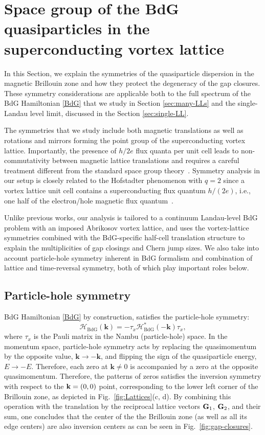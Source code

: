 \documentclass[10pt,prb,aps,superscriptaddress,amsmath,amssymb,twocolumn,floatfix,longbibliography]{revtex4-1}
\newcommand{\be}{\begin{equation} }
\newcommand{\ee}{\end{equation}}
\newcommand{\bk}{{\bf k}}
\newcommand{\bG}{{\bf G}}
\begin{document}
\section{Space group of the BdG quasiparticles in the superconducting vortex lattice}
\label{sec:symmetry}

In this Section, we explain the symmetries of the quasiparticle dispersion in the magnetic Brillouin zone and how they protect the degeneracy of the gap closures. These symmetry considerations are applicable both to the full spectrum of the BdG Hamiltonian \eqref{BdG} that we study in Section \ref{sec:many-LLs} and the single-Landau level limit, discussed in the Section \ref{sec:single-LL}. 

The symmetries that we study include both magnetic translations as well as rotations and mirrors forming the point group of the superconducting vortex lattice. Importantly,  the presence of $h/2e$ flux quanta per unit cell leads to non-commutativity between magnetic lattice translations and requires a careful treatment different from the standard space group theory~\cite{Cosic-Hofstadter-groups, JCano-flux}. 
Symmetry analysis in our setup is closely related to the Hofstadter phenomenon\cite{Harper, Hofstadter} with $q=2$ since a vortex lattice unit cell contains a superconducting flux quantum $h/(2e)$, i.e., one half of the electron/hole magnetic flux quantum~\cite{Shaffer-HofstadterSC}. 

Unlike previous works, our analysis is tailored to a continuum Landau-level BdG problem with an imposed Abrikosov vortex lattice, and uses the vortex-lattice symmetries combined with the BdG-specific half-cell translation structure to explain the multiplicities of gap closings and Chern jump sizes. We also take into account particle-hole symmetry inherent in BdG formalism and combination of lattice and time-reversal symmetry, both of which play important roles below. 

\subsection{Particle-hole symmetry}

BdG Hamiltonian \eqref{BdG} by construction, satisfies the particle-hole symmetry:
\be 
    \mathcal{H}_{\text{BdG}}(\bm{k}) = - \tau_x \mathcal{H}_{\text{BdG}}^*(-\bm{k}) \tau_x,
\ee
where $\tau_x$ is the Pauli matrix in the Nambu (particle-hole) space. In the momentum space, particle-hole symmetry acts by replacing the quasimomentum by the opposite value, $\bm{k} \rightarrow - \bm{k}$, and flipping the sign of the quasiparticle energy, $E\rightarrow-E$. Therefore, each zero at $\bm{k} \neq 0$ is accompanied by a zero at the opposite quasimomentum. Therefore, the patterns of zeros satisfies the inversion symmetry with respect to the $\bk=(0,0)$ point, corresponding to the lower left corner of the Brillouin zone, as depicted in Fig.~\ref{fig:Lattices}(c, d). By combining this operation with the translation by the reciprocal lattice vectors $\bG_1$, $\bG_2$, and their sum, one concludes that the center of the the Brillouin zone (as well as all its edge centers) are also inversion centers as can be seen in Fig.~\ref{fig:gap-closures}.
\end{document}
